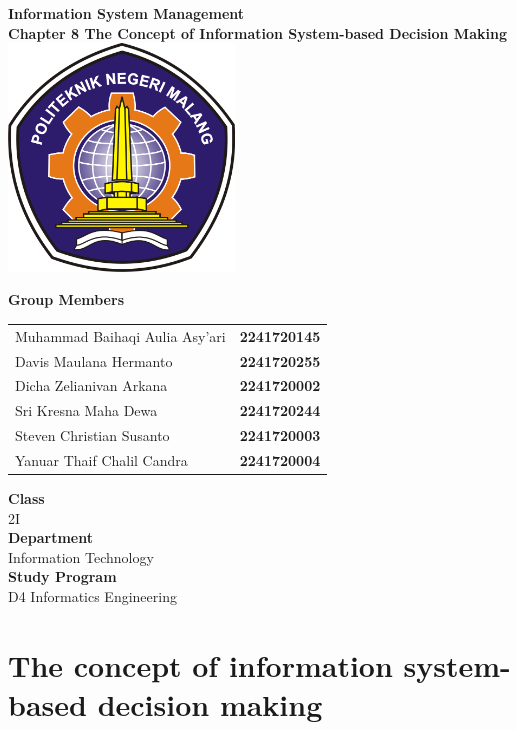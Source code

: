 \documentclass[12pt,titlepage]{article}
\newcommand{\vSubject}{Information System Management}
\newcommand{\vSubtitle}{Chapter 8}
\newcommand{\vSubsubtitle}{The Concept of Information System-based Decision Making}
\newcommand{\vClass}{2I}
\newcommand{\vDepartment}{Information Technology}
\newcommand{\vStudyProgram}{D4 Informatics Engineering}
\begin{document}
\begin{titlepage}
    \centering
    \vfill
    {\bfseries\LARGE
        \vSubject\\
        \vskip0.25cm
        \vSubtitle
        \vskip0.25cm
        \vSubsubtitle
    }
    \vfill
    \includegraphics[width=6cm]{images/polinema-logo.png}
    \vfill
    {
        \textbf{Group Members}\\
        \vspace{0.5cm}
        \begin{tabular}{l l}
            Muhammad Baihaqi Aulia Asy'ari & \textbf{2241720145} \\
            Davis Maulana Hermanto & \textbf{2241720255} \\
            Dicha Zelianivan Arkana & \textbf{2241720002} \\
            Sri Kresna Maha Dewa & \textbf{2241720244} \\
            Steven Christian Susanto & \textbf{2241720003} \\
            Yanuar Thaif Chalil Candra & \textbf{2241720004}\\
        \end{tabular}
        \vskip0.5cm
        \textbf{Class}\\
        \vClass\\
        \vskip0.5cm
        \textbf{Department}\\
        \vDepartment\\
        \vskip0.5cm
        \textbf{Study Program}\\
        \vStudyProgram
    }
\end{titlepage}

\newpage

\section{The concept of information system-based decision making}
\end{document}
